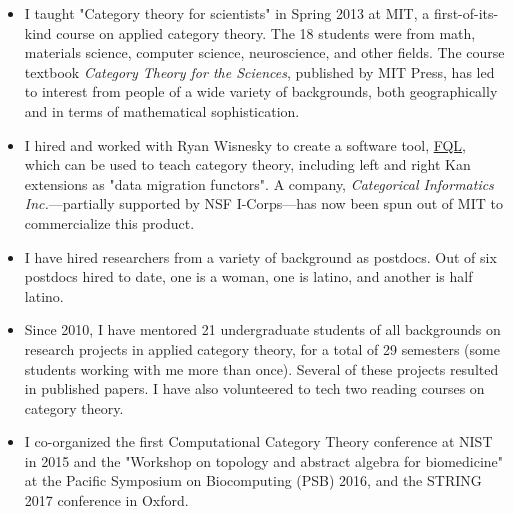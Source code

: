 \documentclass[12pt,letterpaper]{amsart}
\begin{document}
\begin{itemize}
\item
  I taught "Category theory for scientists" in Spring 2013 at MIT,
  a first-of-its-kind course on applied category theory. The 18
  students were from math, materials science, computer science,
  neuroscience, and other fields. The course textbook \emph{Category
    Theory for the Sciences}, published by MIT Press, has led to
  interest from people of a wide variety of backgrounds, both
  geographically and in terms of mathematical sophistication.
\item
  I hired and worked with Ryan Wisnesky to create a software tool,
  \href{http://categoricaldata.net/fql.html}{FQL}, which can be used
  to teach category theory, including left and right Kan extensions as
  "data migration functors". A company, \emph{Categorical Informatics
    Inc.}---partially supported by NSF I-Corps---has now been spun out
  of MIT to commercialize this product.
\item
  I have hired researchers from a variety of background as
  postdocs. Out of six postdocs hired to date, one is a woman, one is
  latino, and another is half latino.
\item
  Since 2010, I have mentored 21 undergraduate students of all
  backgrounds on research projects in applied category theory, for a
  total of 29 semesters (some students working with me more than
  once). Several of these projects resulted in published papers. I
  have also volunteered to tech two reading courses on category
  theory.
\item
  I co-organized the first Computational Category Theory
  conference at NIST in 2015 and the "Workshop on topology and
  abstract algebra for biomedicine" at the Pacific Symposium on
  Biocomputing (PSB) 2016, and the STRING 2017 conference in Oxford.
\end{itemize}
\end{document}
